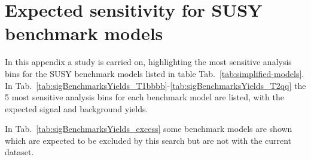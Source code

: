 \section{Expected sensitivity for SUSY benchmark models \label{app:sensitivity-benchmarks}}
In this appendix a study is carried on, highlighting the most sensitive analysis bins for the SUSY 
benchmark models listed in table Tab.~\ref{tab:simplified-models}. \\
In Tab.~\ref{tab:sigBenchmarksYields_T1bbbb}-\ref{tab:sigBenchmarksYields_T2qq} the 5 most sensitive analysis bins 
for each benchmark model are listed, with the expected signal and background yields.

In Tab.~\ref{tab:sigBenchmarksYields_excess} some benchmark models are shown which 
are expected to be excluded by this search but are not with the current dataset. 

